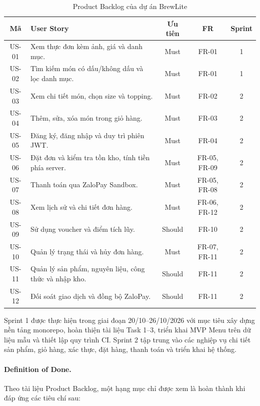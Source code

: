 \begin{table}[H]
\centering
\scriptsize
\caption{Product Backlog của dự án BrewLite}
\label{tabB:backlog}
\begin{tabularx}{\textwidth}{@{}c X c c c@{}}
\toprule
\textbf{Mã} & \textbf{User Story} & \textbf{Ưu tiên} &
\textbf{FR} & \textbf{Sprint} \\
\midrule
US-01 & Xem thực đơn kèm ảnh, giá và danh mục. & Must & FR-01 & 1 \\
US-02 & Tìm kiếm món có dấu/không dấu và lọc danh mục. & Must & FR-01 & 1 \\
US-03 & Xem chi tiết món, chọn size và topping. & Must & FR-02 & 2 \\
US-04 & Thêm, sửa, xóa món trong giỏ hàng. & Must & FR-03 & 2 \\
US-05 & Đăng ký, đăng nhập và duy trì phiên JWT. & Must & FR-04 & 2 \\
US-06 & Đặt đơn và kiểm tra tồn kho, tính tiền phía server. & Must & FR-05, FR-09 & 2 \\
US-07 & Thanh toán qua ZaloPay Sandbox. & Must & FR-05, FR-08 & 2 \\
US-08 & Xem lịch sử và chi tiết đơn hàng. & Must & FR-06, FR-12 & 2 \\
US-09 & Sử dụng voucher và điểm tích lũy. & Should & FR-10 & 2 \\
US-10 & Quản lý trạng thái và hủy đơn hàng. & Must & FR-07, FR-11 & 2 \\
US-11 & Quản lý sản phẩm, nguyên liệu, công thức và nhập kho. & Should & FR-11 & 2 \\
US-12 & Đối soát giao dịch và đồng bộ ZaloPay. & Should & FR-11 & 2 \\
\bottomrule
\end{tabularx}
\end{table}

Sprint 1 được thực hiện trong giai đoạn 20/10--26/10/2026 với mục tiêu
xây dựng nền tảng monorepo, hoàn thiện tài liệu Task 1--3, triển khai
MVP Menu trên dữ liệu mẫu và thiết lập quy trình CI. Sprint 2 tập trung
vào các nghiệp vụ chi tiết sản phẩm, giỏ hàng, xác thực, đặt hàng,
thanh toán và triển khai hệ thống.

\paragraph{Definition of Done.}
Theo tài liệu Product Backlog, một hạng mục chỉ được xem là hoàn thành
khi đáp ứng các tiêu chí sau:

